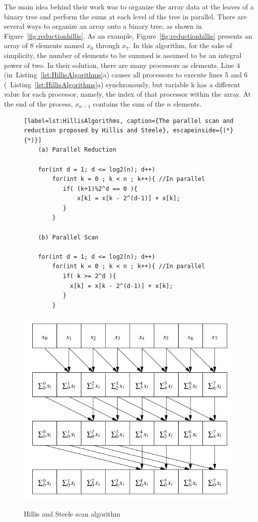 \documentclass[Ingles]{ic-tese-v1}
\newcommand{\rfig}[1]{Figure~\ref{fig:#1}}
\newcommand{\rlsts}[2]{Listing~\ref{lst:#1}{#2}}
\begin{document}
The main idea behind their work was to organize the array data at the leaves of a
binary tree and perform the sums at each level of the tree in parallel. There are several ways to organize an array onto a binary tree, as shown in  \rfig{reductionhillis}. As an example, \rfig{reductionhillis} presents an array of 8 elements named $x_{0}$ through $x_{7}$. In this algorithm, for the sake of simplicity, the number of elements to be summed is assumed to be an integral power of two. In their solution, there are many processors as elements. Line $4$ (in~\rlsts{HillisAlgorithms}{a}) causes all processors to execute lines $5$ and $6$ (~\rlsts{HillisAlgorithms}{a}) synchronously, but variable k has a different value for each processor, namely, the index of that processor within the array. At the end of the process, $x_{n-1}$ contains the sum of the $n$ elements.


\begin{figure}[t]
	\lstset{basicstyle=\scriptsize}
	\begin{lstlisting}[label=lst:HillisAlgorithms, caption={The parallel scan and reduction proposed by Hillis and Steele}, escapeinside={(*}{*)}]
	(a) Parallel Reduction

	for(int d = 1; d <= log2(n); d++)
	    for(int k = 0 ; k < n ; k++){ //In parallel
	       if( (k+1)%2^d == 0 ){
	           x[k] = x[k - 2^(d-1)] + x[k];
	       }
	    }

	(b) Parallel Scan

	for(int d = 1; d <= log2(n); d++)
	    for(int k = 0 ; k < n ; k++){ //In parallel
	       if( k >= 2^d ){
	         x[k] = x[k - 2^(d-1)] + x[k];
	       }
	    }

	\end{lstlisting}
\end{figure}

\begin{figure}[h]
	\centering
	\caption{Hillis and  Steele scan algorithm}
	\includegraphics[scale=0.5]{images/hillisscan.png}
	\label{fig:scanhillis}
\end{figure}
\end{document}
